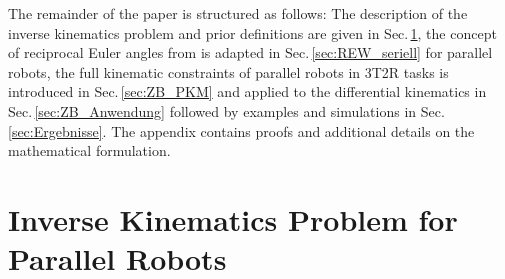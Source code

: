 \documentclass[robotics,article,submit,moreauthors,pdftex]{Definitions/mdpi}
\begin{document}

The remainder of the paper is structured as follows:
The description of the inverse kinematics problem and prior definitions are given in Sec.\,\ref{sec:PKM_general}, the concept of reciprocal Euler angles from \cite{1_SchapplerTapOrt2019} is adapted in Sec.\,\ref{sec:REW_seriell} for parallel robots, the full kinematic constraints of parallel robots in 3T2R tasks is introduced in Sec.\,\ref{sec:ZB_PKM} and applied to the differential kinematics in Sec.\,\ref{sec:ZB_Anwendung} followed by examples and simulations in Sec.\,\ref{sec:Ergebnisse}.
The appendix contains proofs and additional details on the mathematical formulation.

\section{Inverse Kinematics Problem for Parallel Robots}
\label{sec:PKM_general}
\end{document}
